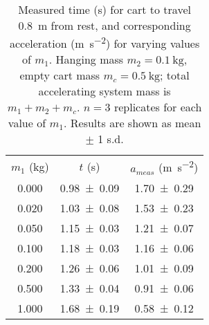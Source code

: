 \begin{table}
\caption{\label{tab:newtable1} Measured time (\unit{\second}) for cart to travel \qty{0.8}{\meter} from rest, and corresponding acceleration (\unit{\meter\per\second\squared}) for varying values of $m_1$. Hanging mass $m_2=\qty{0.1}{\kilo\gram}$, empty cart mass $m_c=\qty{0.5}{\kilo\gram}$; total accelerating system mass is $m_1+m_2+m_c$. $n=3$ replicates for each value of $m_1$. Results are shown as mean $\pm$ 1 s.d.}
\begin{center}
\begin{ruledtabular}
\begin{tabular}{ccc}
$m_1$ (\unit{\kilo\gram}) & $t$ (\unit{\second}) & $a_{meas}$ (\unit{\meter\per\second\squared}) \\ 
\colrule
\num{0.000} & \num{0.98\pm0.09} & \num{1.70\pm0.29} \\ 
\num{0.020} & \num{1.03\pm0.08} & \num{1.53\pm0.23} \\ 
\num{0.050} & \num{1.15\pm0.03} & \num{1.21\pm0.07} \\ 
\num{0.100} & \num{1.18\pm0.03} & \num{1.16\pm0.06} \\ 
\num{0.200} & \num{1.26\pm0.06} & \num{1.01\pm0.09} \\ 
\num{0.500} & \num{1.33\pm0.04} & \num{0.91\pm0.06} \\ 
\num{1.000} & \num{1.68\pm0.19} & \num{0.58\pm0.12} \\ 
\end{tabular}
\end{ruledtabular}
\end{center}
\end{table}
